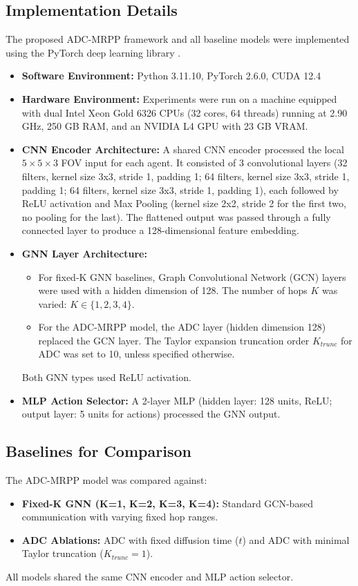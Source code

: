 \subsection{Implementation Details}
\label{subsec:implementation_details}
The proposed ADC-MRPP framework and all baseline models were implemented using the PyTorch deep learning library \cite{Paszke2019PyTorch}.
\begin{itemize}
    \item \textbf{Software Environment:} Python 3.11.10, PyTorch 2.6.0, CUDA 12.4
    \item \textbf{Hardware Environment:} Experiments were run on a machine equipped with dual Intel Xeon Gold 6326 CPUs (32 cores, 64 threads) running at 2.90 GHz, 250 GB RAM, and an NVIDIA L4 GPU with 23 GB VRAM.
    \item \textbf{CNN Encoder Architecture:} A shared CNN encoder processed the local $5 \times 5 \times 3$ FOV input for each agent. It consisted of 3 convolutional layers (32 filters, kernel size 3x3, stride 1, padding 1; 64 filters, kernel size 3x3, stride 1, padding 1; 64 filters, kernel size 3x3, stride 1, padding 1), each followed by ReLU activation and Max Pooling (kernel size 2x2, stride 2 for the first two, no pooling for the last). The flattened output was passed through a fully connected layer to produce a 128-dimensional feature embedding.
    \item \textbf{GNN Layer Architecture:}
        \begin{itemize}
            \item For fixed-K GNN baselines, Graph Convolutional Network (GCN) layers \cite{Kipf2017GCN} were used with a hidden dimension of 128. The number of hops $K$ was varied: $K \in \{1, 2, 3, 4\}$.
            \item For the ADC-MRPP model, the ADC layer (hidden dimension 128) replaced the GCN layer. The Taylor expansion truncation order $K_{trunc}$ for ADC was set to 10, unless specified otherwise.
        \end{itemize}
        Both GNN types used ReLU activation.
    \item \textbf{MLP Action Selector:} A 2-layer MLP (hidden layer: 128 units, ReLU; output layer: 5 units for actions) processed the GNN output.
\end{itemize}

\subsection{Baselines for Comparison}
\label{subsec:baselines}
The ADC-MRPP model was compared against:
\begin{itemize}
    \item \textbf{Fixed-K GNN (K=1, K=2, K=3, K=4):} Standard GCN-based communication with varying fixed hop ranges.
    \item \textbf{ADC Ablations:} ADC with fixed diffusion time ($t$) and ADC with minimal Taylor truncation ($K_{trunc}=1$).
\end{itemize}
All models shared the same CNN encoder and MLP action selector.

